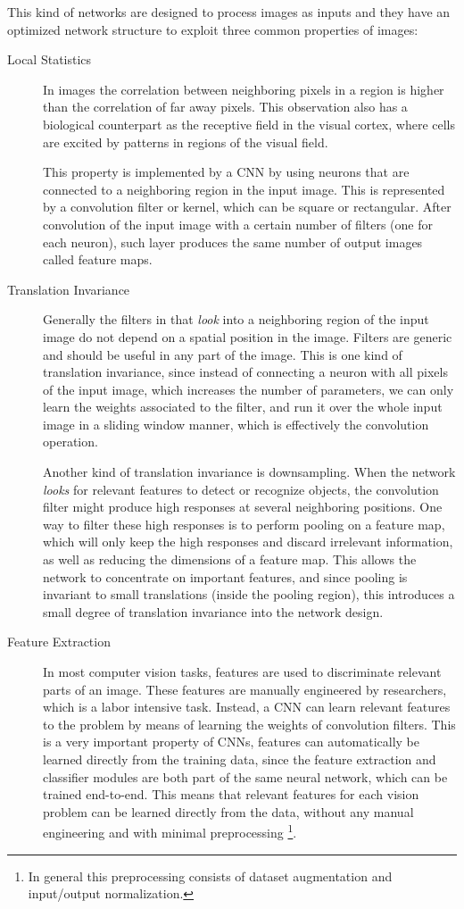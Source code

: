 This kind of networks are designed to process images as inputs and they have an optimized network structure to exploit three common properties of images:

\begin{description}
	\item[Local Statistics] In images the correlation between neighboring pixels in a region is higher than the correlation of far away pixels. This observation also has a biological counterpart as the receptive field in the visual cortex, where cells are excited by patterns in regions of the visual field.
	
	This property is implemented by a CNN by using neurons that are connected to a neighboring region in the input image. This is represented by a convolution filter or kernel, which can be square or rectangular. After convolution of the input image with a certain number of filters (one for each neuron), such layer produces the same number of output images called feature maps.
	
	\item[Translation Invariance] Generally the filters in that \textit{look} into a neighboring region of the input image do not depend on a spatial position in the image. Filters are generic and should be useful in any part of the image. This is one kind of translation invariance, since instead of connecting a neuron with all pixels of the input image, which increases the number of parameters, we can only learn the weights associated to the filter, and run it over the whole input image in a sliding window manner, which is effectively the convolution operation.
	
	Another kind of translation invariance is downsampling. When the network \textit{looks} for relevant features to detect or recognize objects, the convolution filter might produce high responses at several neighboring positions. One way to filter these high responses is to perform pooling on a feature map, which will only keep the high responses and discard irrelevant information, as well as reducing the dimensions of a feature map.
	This allows the network to concentrate on important features, and since pooling is invariant to small translations (inside the pooling region), this introduces a small degree of translation invariance into the network design.
	
	\item[Feature Extraction] In most computer vision tasks, features are used to discriminate relevant parts of an image. These features are manually engineered by researchers, which is a labor intensive task. Instead, a CNN can learn relevant features to the problem by means of learning the weights of convolution filters.
	This is a very important property of CNNs, features can automatically be learned directly from the training data, since the feature extraction and classifier modules are both part of the same neural network, which can be trained end-to-end. This means that relevant features for each vision problem can be learned directly from the data, without any manual engineering and with minimal preprocessing \footnote{In general this preprocessing consists of dataset augmentation and input/output normalization.}.
\end{description}

